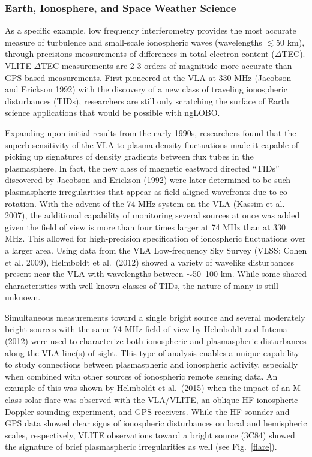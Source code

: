 \documentclass[11pt]{article}
\begin{document}
\subsubsection{Earth, Ionosphere, and Space Weather Science}

As a specific example, low frequency interferometry provides the most accurate measure of turbulence and small-scale ionospheric waves (wavelengths $\lesssim$50 km), through precisions measurements of differences in total electron content ($\Delta$TEC). VLITE $\Delta$TEC measurements are 2-3 orders of magnitude more accurate than GPS based measurements.  First pioneered at the VLA at 330 MHz (Jacobson and Erickson 1992)  with the discovery of a new class of traveling ionospheric  disturbances (TIDs), researchers are still only scratching the surface of Earth science applications that would be possible with ngLOBO. 

Expanding upon initial results from the early 1990s, researchers found that the superb sensitivity of the VLA to plasma density fluctuations made it capable of picking up signatures of density gradients between flux tubes in the plasmasphere.  In fact, the new class of magnetic eastward directed ``TIDs'' discovered by Jacobson and Erickson (1992) were later determined to be such plasmaspheric irregularities that appear as field aligned wavefronts due to co-rotation.  With the advent of the 74 MHz system on the VLA (Kassim et al. 2007), the additional capability of monitoring several sources at once was added given the field of view is more than four times larger at 74 MHz than at 330 MHz.  This allowed for high-precision specification of ionospheric fluctuations over a larger area.  Using data from the VLA Low-frequency Sky Survey (VLSS; Cohen et al. 2009), Helmboldt et al.\ (2012) showed a variety of wavelike disturbances present near the VLA with wavelengths between $\sim$50--100 km.  While some shared characteristics with well-known classes of TIDs, the nature of many is still unknown.

Simultaneous measurements toward a single bright source and several moderately bright sources with the same 74 MHz field of view by Helmboldt and Intema (2012) were used to characterize both ionospheric and plasmaspheric disturbances along the VLA line(s) of sight.  This type of analysis enables a unique capability to study connections between plasmaspheric and ionospheric activity, especially when combined with other sources of ionospheric remote sensing data.  An example of this was shown by Helmboldt et al.\ (2015) when the impact of an M-class solar flare was observed with the VLA/VLITE, an oblique HF ionospheric Doppler sounding experiment, and GPS receivers.  While the HF sounder and GPS data showed clear signs of ionospheric disturbances on local and hemispheric scales, respectively, VLITE observations toward a bright source (3C84) showed the signature of brief plasmaspheric irregularities as well (see Fig.\ \ref{flare}).
\end{document}
